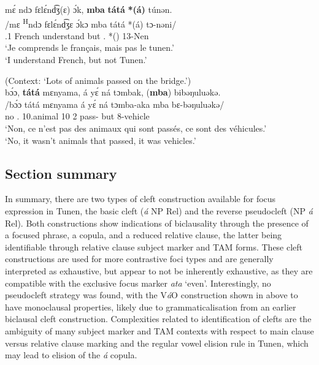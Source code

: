 \documentclass[output=paper,colorlinks,citecolor=brown
]{langscibook}
\begin{document}
\z 

\ea
\glll
{\db}mɛ́ ndɔ	fɛlɛ́nd͡ʒ(ɛ)	ɔ́k,	\textbf{mba}	\textbf{tátá}  \textbf{*(á)}	túnən. \\
/mɛ \textsuperscript{H}ndɔ	fɛlɛ́nd͡ʒɛ	ɔ́kɔ	mba	tátá *(á)	tɔ-nəni/ \\
{\db}\SM{}.1\SG{} \PRS{}	French	understand	but	\COP{}.\NEG{} *(\COP{})	13-Nen \\
\glt
`Je comprends le français, mais pas le tunen.' \\`I understand French, but not Tunen.' \jambox*{[PM 92] }

\z


\ea
\label{animalspass}
(Context: `Lots of animals passed on the bridge.') \\
\glll
{\db}bɔ́ɔ,	\textbf{tátá}	mɛnyama,	á	yɛ́ ná	tɔmbak, (\textbf{mba})	bibəŋuluəkə. \\
/bɔ́ɔ	tátá	mɛnyama	á	yɛ́ ná	tɔmba-aka mba	bɛ-bəŋuluəkə/ \\
{\db}no	\COP{}.\NEG{}	10.animal	\COP{}	10\SM{} \PST{}2{}	pass-\DUR{} but	8-vehicle \\
\glt
`Non, ce n’est pas des animaux qui sont passés, ce sont des véhicules.’ \\ `No, it wasn't animals that passed, it was vehicles.' \jambox*{[PM 1579] }

\z

\subsection{Section summary}
In summary, there are two types of cleft construction available for focus expression in Tunen, the basic cleft (\textit{á} NP\textsubscript{\FOC{}} Rel) and the reverse pseudocleft (NP\textsubscript{\FOC{}} \textit{á} Rel). Both constructions show indications of biclausality through the presence of a focused phrase, a copula, and a reduced relative clause, the latter being identifiable through relative clause subject marker and TAM forms. These cleft constructions are used for more contrastive foci types and are generally interpreted as exhaustive, but appear to not be inherently exhaustive, as they are compatible with the exclusive focus marker \textit{ata} `even'. Interestingly, no pseudocleft strategy was found, with the V\textit{á}O construction shown in  above to have monoclausal properties, likely due to grammaticalisation from an earlier biclausal cleft construction. Complexities related to identification of clefts are the ambiguity of many subject marker and TAM contexts with respect to main clause versus relative clause marking and the regular vowel elision rule in Tunen, which may lead to elision of the \textit{á} copula.
\end{document}
